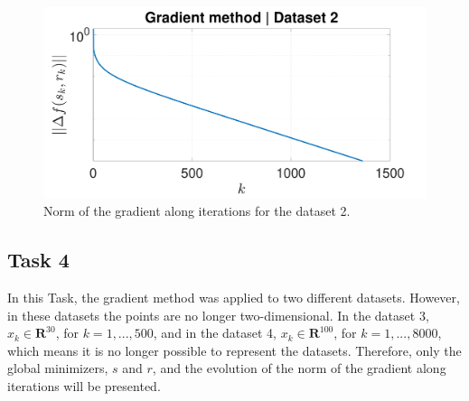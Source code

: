 \documentclass[12pt]{article}
\begin{document}
\begin{figure}[ht!]
    \centering
    \includegraphics[width=\textwidth]{figures/GDNormGradDataset2.pdf}
    \caption{Norm of the gradient along iterations for the dataset 2.}
    \label{fig:GD_norm_dataset2}
\end{figure}

\subsection{Task 4}

In this Task, the gradient method was applied to two different datasets. However, in these datasets the points are no longer two-dimensional. In the dataset 3, $x_k \in \mathbf{R}^{30}$, for $k=1,...,500$, and in the dataset 4, $x_k \in \mathbf{R}^{100}$, for $k=1,...,8000$, which means it is no longer possible to represent the datasets. Therefore, only the global minimizers, $s$ and $r$, and the evolution of the norm of the gradient along iterations will be presented.
\end{document}

